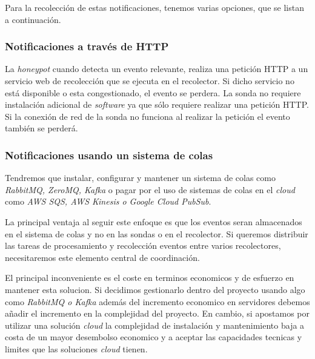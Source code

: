 Para la recolección de estas notificaciones, tenemos varias opciones, que se listan a continuación.

\subsubsection{Notificaciones a través de HTTP}

La \emph{honeypot} cuando detecta un evento relevante, realiza una petición HTTP a un servicio web de recolección que se ejecuta en el recolector.
Si dicho servicio no está disponible o esta congestionado, el evento se perdera.
La sonda no requiere instalación adicional de \emph{software} ya que sólo requiere realizar una petición HTTP. 
Si la conexión de red de la sonda no funciona al realizar la petición el evento también se perderá.

\subsubsection{Notificaciones usando un sistema de colas}

Tendremos que instalar, configurar y mantener un sistema de colas como \emph{RabbitMQ, ZeroMQ, Kafka} 
o pagar por el uso de sistemas de colas en el \emph{cloud} como \emph{AWS SQS, AWS Kinesis o Google Cloud PubSub}.

La principal ventaja al seguir este enfoque es que los eventos seran almacenados en el sistema de colas y no en las sondas o en el recolector. Si queremos
distribuir las tareas de procesamiento y recolección eventos entre varios recolectores, necesitaremos este elemento central de coordinación.

El principal inconveniente es el coste en terminos economicos y de esfuerzo en mantener esta solucion. 
Si decidimos gestionarlo dentro del proyecto usando algo como \emph{RabbitMQ o Kafka} además del incremento economico en servidores 
debemos añadir el incremento en la complejidad del proyecto. En cambio, si apostamos por utilizar una solución \emph{cloud} la complejidad
de instalación y mantenimiento baja a costa de un mayor desembolso economico y a aceptar las capacidades tecnicas y limites que las soluciones 
\emph{cloud} tienen.

